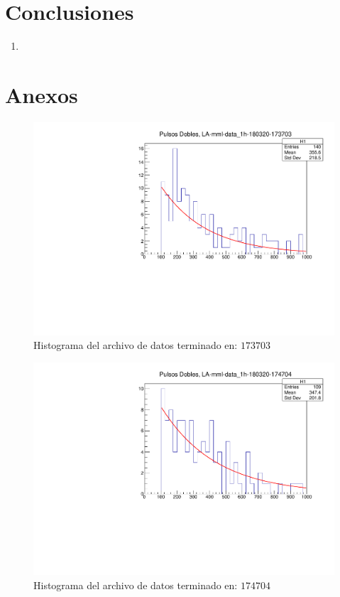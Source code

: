 \documentclass[conference]{IEEEtran}
\begin{document}
\section{Conclusiones}
\begin{enumerate}
    \item 
\end{enumerate}

\section{Anexos}
		\begin{figure}[H]
            \centering
            \includegraphics[scale=0.45]{./Imagenes/file1.pdf}
            \caption{Histograma del archivo de datos terminado en: $173703$}
            \label{fig:file1}
        \end{figure}  
        \begin{figure}[H]
            \centering
            \includegraphics[scale=0.45]{./Imagenes/file2.pdf}
            \caption{Histograma del archivo de datos terminado en: $174704$}
            \label{fig:file2}
        \end{figure} 
\end{document}

